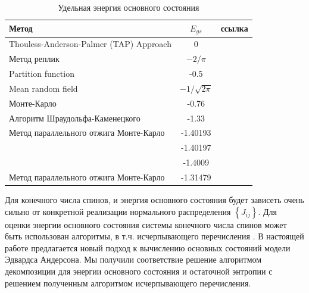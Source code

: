 \documentclass[utf8, babel, sor, jor, amsmath, amssymb, reprint]{elsarticle} %
\begin{document}
\begin{table}[!h]
	\begin{tabular}{|l|c|l|}
		\hline
		Метод                                   & $E_{gs}$                                       & ссылка                                          \\ \hline
		Thouless-Anderson-Palmer (TAP) Approach & 0                                              & \cite{thouless1977solution}    \\ \hline
		Метод реплик                            & $-2/\pi$                                       & \cite{sherrington1975solvable} \\ \hline
		Partition function                      & -0.5                                           & \cite{tanaka1980analytic}      \\ \hline
		Mean random field                       & $-1/\sqrt{2\pi}$                               & \cite{klein1976comparison}     \\ \hline
		Монте-Карло                             & -0.76                                          & \cite{kirkpatrick1978infinite} \\ \hline
		Алгоритм Шраудольфа-Каменецкого         & -1.33                                          & \cite{karandashev2019global}   \\ \hline
		Метод параллельного отжига Монте-Карло  & -1.40193                                       & \cite{palmer1999ground}        \\ \hline
		                                        & -1.40197                                       & \cite{campbell2004energy}      \\ \hline
		                                        & -1.4009                                        & \cite{roma2009ground}          \\ \hline
		Метод параллельного отжига Монте-Карло  & -1.31479                                       & \cite{roma2009ground}          \\ \hline
	\end{tabular}
	\label{tab:Egs}
	\caption{Удельная энергия основного состояния}
\end{table}

Для конечного числа спинов, и энергия основного состояния будет зависеть очень сильно от конкретной реализации нормального распределения $\left\lbrace J_{ij} \right\rbrace $. Для оценки энергии основного состояния системы конечного числа спинов может быть использован алгоритмы, в т.ч. исчерпывающего перечисления \cite{padalko2021parallel}. В настоящей работе предлагается новый подход к вычислению основных состояний модели Эдвардса Андерсона. Мы получили соответствие решение алгоритмом декомпозиции для энергии основного состояния и остаточной энтропии с решением полученным алгоритмом исчерпывающего перечисления.  
\end{document}
